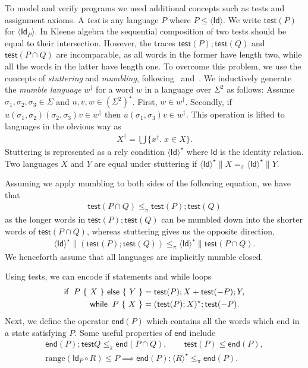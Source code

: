 \documentclass{llncs}
\newcommand{\test}{\mathsf{test}}
\newcommand{\Id}{\mathsf{Id}}
\newcommand{\edn}{\mathsf{end}}
\begin{document}
To model and verify programs we need additional concepts such as tests
and assignment axioms. A \emph{test} is any language $P$ where $P \le
\langle \Id\rangle$. We write $\test(P)$ for $\langle
\Id_P\rangle$. In Kleene algebra the sequential composition of two
tests should be equal to their intersection. However, the traces
$\test(P); \test(Q)$ and $\test(P \cap Q)$ are incomparable, as all
words in the former have length two, while all the words in the latter
have length one. To overcome this problem, we use the concepts of
\emph{stuttering} and \emph{mumbling},
following~\cite{brookes_full_1993}
and~\cite{dingel_refinement_2002}. We inductively generate the
\emph{mumble language} $w^\dagger$ for a word $w$ in a language over
$\Sigma^2$ as follows: Assume $\sigma_1,\sigma_2,\sigma_3 \in \Sigma$
and $u,v,w \in (\Sigma^2)^\star$. First, $w \in w^\dagger$. Secondly,
if $u(\sigma_1,\sigma_2)(\sigma_2,\sigma_3)v \in w^\dagger$ then
$u(\sigma_1,\sigma_3)v \in w^\dagger$. This operation is lifted to
languages in the obvious way as
\begin{align*}
X^\dagger = \bigcup\{x^\dagger.\; x \in X\}.
\end{align*}
Stuttering is represented as a rely condition $\langle \Id\rangle^\star$
where $\Id$ is the identity relation. Two languages $X$ and $Y$ are
equal under stuttering if $\langle \Id\rangle^\star \| X =_\pi \langle
\Id\rangle^\star \| Y$.

Assuming we apply mumbling to both sides of the following equation, we have that
\begin{align*}
\test(P \cap Q) \le_\pi \test(P); \test(Q)
\end{align*}
as the longer words in $\test(P);\test(Q)$ can be mumbled down into
the shorter words of $\test(P\cap Q)$, whereas stuttering gives us the opposite direction,
\begin{align*}
\langle \Id\rangle^\star \| (\test(P);\test(Q)) \le_\pi \langle \Id\rangle^\star \| \test(P \cap Q).
\end{align*}
We henceforth assume that all languages are
implicitly mumble closed.

Using tests, we can encode if statements and while loops
\begin{align*}
\mathsf{if }\;\; P \text{ \{ } X \text { \} \textsf{else} \{ } Y \text{ \}} &= \test(P); X + \test(- P); Y,\\
\mathsf{while}\;\; P \text{ \{ } X \text{ \}} &= (\test(P);X)^\star;\test(- P).
\end{align*}
Next, we define the operator $\edn(P)$ which contains all the
words which end in a state satisfying $P$. Some useful properties of $\edn$ include
\begin{gather*}
\edn(P); \test{Q} \le_\pi \edn(P \cap Q), \qquad
\test(P) \le \edn(P),\\
\text{range}(\Id_P \circ R) \le P \implies \edn(P); \langle R\rangle^\star \le_\pi \edn(P).
\end{gather*}
\end{document}
